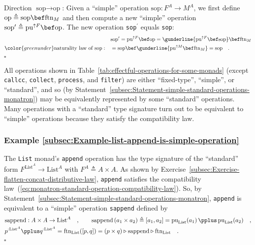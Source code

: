 Direction $\text{sop}\rightarrow\text{op}$: Given a \textsf{``}simple\textsf{''}
operation $\text{sop}:F^{A}\rightarrow M^{A}$, we first define $\text{op}\triangleq\text{sop}\bef\text{ftn}_{M}$
and then compute a new \textsf{``}simple\textsf{''} operation $\text{sop}^{\prime}\triangleq\text{pu}^{\uparrow F}\bef\text{op}$.
The new operation \lstinline!sop!$^{\prime}$ equals \lstinline!sop!:
\begin{align*}
 & \text{sop}^{\prime}=\text{pu}^{\uparrow F}\bef\text{op}=\gunderline{\text{pu}^{\uparrow F}\bef\text{sop}}\bef\text{ftn}_{M}\\
{\color{greenunder}\text{naturality law of }\text{sop}:}\quad & =\text{sop}\bef\gunderline{\text{pu}^{\uparrow M}\bef\text{ftn}_{M}}=\text{sop}\quad.
\end{align*}
$\square$

All operations shown in Table~\ref{tab:effectful-operations-for-some-monads}
(except \lstinline!callcc!, \lstinline!collect!, \lstinline!process!,
and \lstinline!filter!) are either \textsf{``}fixed-type\textsf{''}, \textsf{``}simple\textsf{''},
or \textsf{``}standard\textsf{''}, and so (by Statement~\ref{subsec:Statement-simple-standard-operations-monatron})
may be equivalently represented by some \textsf{``}standard\textsf{''} operations.
Many operations with a \textsf{``}standard\textsf{''} type signature turn out to be
equivalent to \textsf{``}simple\textsf{''} operations because they satisfy the compatibility
law. 

\subsubsection{Example \label{subsec:Example-list-append-is-simple-operation}\ref{subsec:Example-list-append-is-simple-operation}}

The \lstinline!List! monad\textsf{'}s \lstinline!append! operation has the
type signature of the \textsf{``}standard\textsf{''} form $F^{\text{List}^{A}}\rightarrow\text{List}^{A}$
with $F^{A}\triangleq A\times A$. As shown by Exercise~\ref{subsec:Exercise-flatten-concat-distributive-law},
\lstinline!append! satisfies the compatibility law~(\ref{eq:monatron-standard-operation-compatibility-law}).
So, by Statement~\ref{subsec:Statement-simple-standard-operations-monatron},
\lstinline!append! is equivalent to a \textsf{``}simple\textsf{''} operation \lstinline!sappend!
defined by
\begin{align*}
 & \text{sappend}:A\times A\rightarrow\text{List}^{A}\quad,\quad\quad\text{sappend}\left(a_{1}\times a_{2}\right)\triangleq[a_{1},a_{2}]=\text{pu}_{\text{List}}(a_{1})\,\pplus\,\text{pu}_{\text{List}}(a_{2})\quad,\\
 & p^{:\text{List}^{A}}\pplus q^{:\text{List}^{A}}=\text{ftn}_{\text{List}}([p,q])=\left(p\times q\right)\triangleright\text{sappend}\triangleright\text{ftn}_{\text{List}}\quad.
\end{align*}
$\square$

